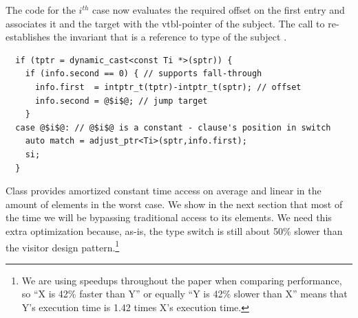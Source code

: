 \noindent
The code for the $i^{th}$ case now evaluates the required offset on the first 
entry and associates it and the target with the vtbl-pointer of the subject.
The call to  re-establishes the invariant that 
 is a reference to type  of the subject .

\begin{lstlisting}
  if (tptr = dynamic_cast<const Ti *>(sptr)) {
    if (info.second == 0) { // supports fall-through
      info.first  = intptr_t(tptr)-intptr_t(sptr); // offset
      info.second = @$i$@; // jump target
    }
  case @$i$@: // @$i$@ is a constant - clause's position in switch
    auto match = adjust_ptr<Ti>(sptr,info.first);
    si;
  }
\end{lstlisting}

\noindent
%

\noindent
Class  provides amortized constant time access on 
average and linear in the amount of elements in the worst case. We show in the 
next section that most of the time we will be bypassing traditional access to 
its elements. We need this extra optimization because, as-is, the type switch is 
still about 50\% slower than the visitor design pattern.\footnote{We are using 
speedups throughout the paper when comparing performance, so ``X is 42\% faster 
than Y'' or equally ``Y is 42\% slower than X'' means that Y's execution time is 
1.42 times X's execution time.}


